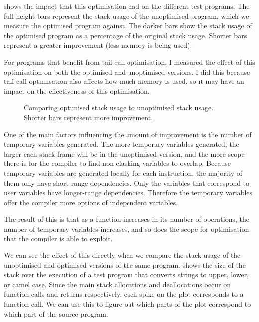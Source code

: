 \documentclass[00-main.tex]{subfiles}
\begin{document}
 shows the impact that this optimisation had on the different test programs.
The full-height bars represent the stack usage of the unoptimised program, which we measure the optimised program against.
The darker bars show the stack usage of the optimised program as a percentage of the original stack usage.
Shorter bars represent a greater improvement (less memory is being used).

For programs that benefit from tail-call optimisation, I measured the effect of this optimisation on both the optimised and unoptimised versions.
I did this because tail-call optimisation also affects how much memory is used, so it may have an impact on the effectiveness of this optimisation.

\begin{figure}[ht]
  \centering
  \caption{Comparing optimised stack usage to unoptimised stack usage. Shorter bars represent more improvement.}
  \label{fig:comparing stack usage optimisation across programs}
\end{figure}

One of the main factors influencing the amount of improvement is the number of temporary variables generated.
The more temporary variables generated, the larger each stack frame will be in the unoptimised version, and the more scope there is for the compiler to find non-clashing variables to overlap.
Because temporary variables are generated locally for each instruction, the majority of them only have short-range dependencies.
Only the variables that correspond to user variables have longer-range dependencies.
Therefore the temporary variables offer the compiler more options of independent variables.

The result of this is that as a function increases in its number of operations, the number of temporary variables increases, and so does the scope for optimisation that the compiler is able to exploit.

We can see the effect of this directly when we compare the stack usage of the unoptimised and optimised versions of the same program.
 shows the size of the stack over the execution of a test program that converts strings to upper, lower, or camel case.
Since the main stack allocations and deallocations occur on function calls and returns respectively, each spike on the plot corresponds to a function call. We can use this to figure out which parts of the plot correspond to which part of the source program.
\end{document}
